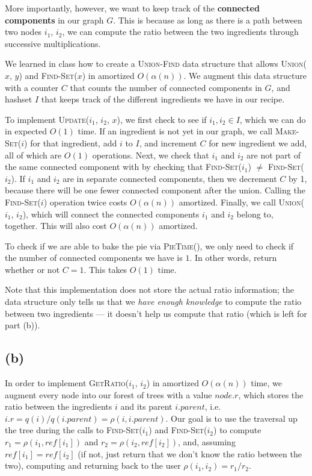 \documentclass{6046}
\begin{document}
More importantly, however, we want to keep track of the
{\bf connected components} in our graph $G$. This is because
as long as there is a path between two nodes $i_1$, $i_2$, we
can compute the ratio between the two ingredients through
successive multiplications.

We learned in class how to create a \textsc{Union-Find} data
structure that allows \textsc{Union($x$, $y$)} and
\textsc{Find-Set($x$)} in amortized $O(\alpha(n))$.
We augment this data structure with a counter $C$ that counts
the number of connected components in $G$, and hashset $I$
that keeps track of the different ingredients
we have in our recipe.

To implement \textsc{Update($i_1$, $i_2$, $x$)}, we first check
to see if $i_1, i_2 \in I$, which we can do in expected $O(1)$
time. If an ingredient is not yet in our graph, we call
\textsc{Make-Set($i$)} for that ingredient, add $i$ to $I$, and
increment $C$ for new ingredient we add,
all of which are $O(1)$ operations. Next, we check that $i_1$
and $i_2$ are not part of the same connected component with
by checking that \textsc{Find-Set($i_1$)} $\neq$
\textsc{Find-Set($i_2$)}. If $i_1$ and $i_2$ are in
separate connected components, then we decrement $C$ by 1,
because there will be one fewer connected component after the
union. Calling the \textsc{Find-Set($i$)} operation twice
costs $O(\alpha(n))$ amortized. Finally, we call
\textsc{Union($i_1$, $i_2$)}, which will connect the
connected components $i_1$ and $i_2$ belong to, together. This
will also cost $O(\alpha(n))$ amortized.

To check if we are able to bake the pie via \textsc{PieTime()},
we only need to check if the number of connected components
we have is $1$. In other words, return whether or not
$C = 1$. This takes $O(1)$ time.

Note that this implementation does not store the actual ratio
information; the data structure only tells us that we {\it have 
enough knowledge} to compute the ratio between two ingredients 
--- it doesn't help us compute that ratio (which is left for 
part (b)).

\subsection*{(b)}
In order to implement \textsc{GetRatio($i_1$, $i_2$)} in
amortized $O(\alpha(n))$ time, we augment every node 
into our forest of trees with a value $node.r$, which
stores the ratio between the ingredients $i$ and its
parent $i.parent$, i.e. $i.r = q(i) / q(i.parent)
= \rho(i, i.parent)$. Our goal is to use
the traversal up the tree during the calls to
\textsc{Find-Set($i_1$)} and \textsc{Find-Set($i_2$)} to
compute $r_1 = \rho(i_1, ref[i_1])$ and $r_2 = \rho(i_2, ref[i_2])$, 
and, assuming $ref[i_1] = ref[i_2]$ (if not, just return
that we don't know the ratio between the two), computing 
and returning back to the user $\rho(i_1, i_2) = r_1 / r_2$.
\end{document}
